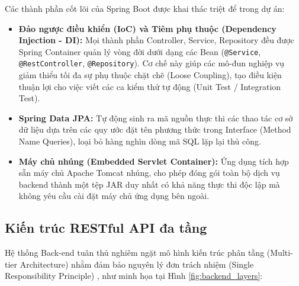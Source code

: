Các thành phần cốt lõi của Spring Boot được khai thác triệt để trong dự án:
\begin{itemize}[leftmargin=1.5cm]
    \item \textbf{Đảo ngược điều khiển (IoC) và Tiêm phụ thuộc (Dependency Injection - DI):} Mọi thành phần Controller, Service, Repository đều được Spring Container quản lý vòng đời dưới dạng các Bean (\texttt{@Service}, \texttt{@RestController}, \texttt{@Repository}). Cơ chế này giúp các mô-đun nghiệp vụ giảm thiểu tối đa sự phụ thuộc chặt chẽ (Loose Coupling), tạo điều kiện thuận lợi cho việc viết các ca kiểm thử tự động (Unit Test / Integration Test).
    \item \textbf{Spring Data JPA:} Tự động sinh ra mã nguồn thực thi các thao tác cơ sở dữ liệu dựa trên các quy ước đặt tên phương thức trong Interface (Method Name Queries), loại bỏ hàng nghìn dòng mã SQL lặp lại thủ công.
    \item \textbf{Máy chủ nhúng (Embedded Servlet Container):} Ứng dụng tích hợp sẵn máy chủ Apache Tomcat nhúng, cho phép đóng gói toàn bộ dịch vụ backend thành một tệp JAR duy nhất có khả năng thực thi độc lập mà không yêu cầu cài đặt máy chủ ứng dụng bên ngoài.
\end{itemize}

\subsection{Kiến trúc RESTful API đa tầng}
Hệ thống Back-end tuân thủ nghiêm ngặt mô hình kiến trúc phân tầng (Multi-tier Architecture) nhằm đảm bảo nguyên lý đơn trách nhiệm (Single Responsibility Principle) \cite{fowler2003}, như minh họa tại Hình \ref{fig:backend_layers}:

